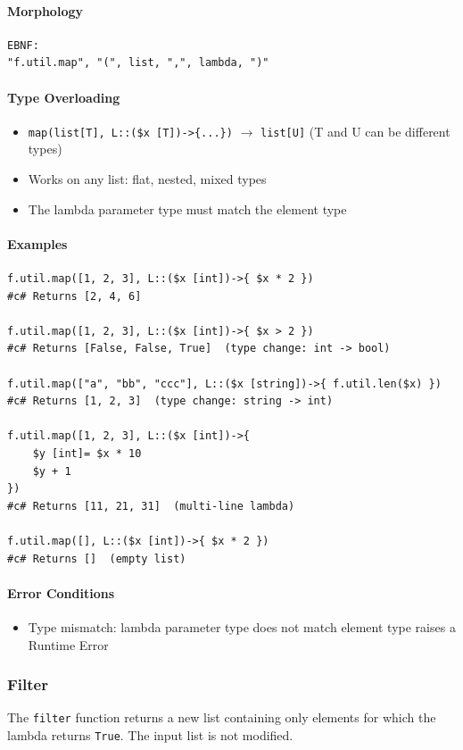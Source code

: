\paragraph{Morphology}
\begin{verbatim}
EBNF:
"f.util.map", "(", list, ",", lambda, ")"
\end{verbatim}

\paragraph{Type Overloading}
\begin{itemize}
\item \texttt{map(list[T], L::(\$x [T])->\{...\})} $\rightarrow$ \texttt{list[U]}
  (T and U can be different types)
\item Works on any list: flat, nested, mixed types
\item The lambda parameter type must match the element type
\end{itemize}

\paragraph{Examples}
\begin{verbatim}
f.util.map([1, 2, 3], L::($x [int])->{ $x * 2 })
#c# Returns [2, 4, 6]

f.util.map([1, 2, 3], L::($x [int])->{ $x > 2 })
#c# Returns [False, False, True]  (type change: int -> bool)

f.util.map(["a", "bb", "ccc"], L::($x [string])->{ f.util.len($x) })
#c# Returns [1, 2, 3]  (type change: string -> int)

f.util.map([1, 2, 3], L::($x [int])->{
    $y [int]= $x * 10
    $y + 1
})
#c# Returns [11, 21, 31]  (multi-line lambda)

f.util.map([], L::($x [int])->{ $x * 2 })
#c# Returns []  (empty list)
\end{verbatim}

\paragraph{Error Conditions}
\begin{itemize}
\item Type mismatch: lambda parameter type does not match element type raises a Runtime Error
\end{itemize}

\subsubsection{Filter}
The \texttt{filter} function returns a new list containing only elements for which the lambda returns \texttt{True}. The input list is not modified.

